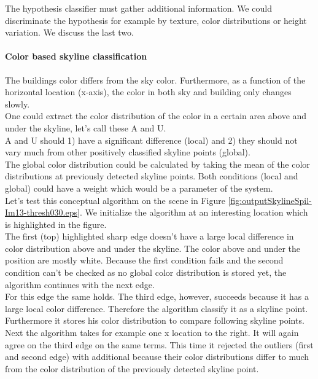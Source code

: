 The hypothesis classifier must gather additional information. We could
discriminate the hypothesis for example by texture, color distributions or height
variation. We discuss the last two.

\paragraph{Color based skyline classification}
The buildings color differs from the sky color. Furthermore,
as a function of the horizontal location (x-axis), the color in both sky and
building only changes slowly.\\

One could extract the color distribution of the color in a certain area above
and under the skyline, let's call these A and U. \\
A and U should 1) have a significant difference (local) and 2) they should not vary much from 
other positively classified skyline points (global).\\

The global color distribution could be calculated by taking the mean of the
color distributions at previously detected skyline points.  Both conditions
(local and global) could have a weight which would be a parameter of the
system.\\

Let's test this conceptual algorithm on the scene in Figure
\ref{fig:outputSkylineSpil-Im13-thresh030.eps}.  We initialize the algorithm at
an interesting location which is highlighted in the figure.\\
The first (top) highlighted sharp edge doesn't have a large local difference in color distribution
above and under the skyline. The color above and under the position are mostly
white. Because the first condition fails and the second condition can't be
checked as no global color distribution is stored yet, the algorithm continues
with the next edge.\\
For this edge the same holds.
The third edge, however, succeeds because it has a large local color difference.
Therefore the algorithm classify it as a skyline point.
Furthermore it stores his color distribution to compare following skyline points.
Next the algorithm takes for example one x
location to the right.  It will again agree on the third edge on the same terms.
This time it rejected the outliers (first and second edge) with additional
because their color distributions differ to much from the color
distribution of the previously detected skyline point.\\

